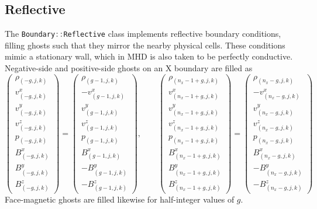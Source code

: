 \documentclass[11pt]{report}
\newcommand{\cpp}[1]{\lstinline[language=C++]{#1}}
\begin{document}
\subsection{Reflective}
The \cpp{Boundary::Reflective} class implements reflective boundary conditions, filling ghosts such that they mirror the nearby physical cells. These conditions mimic a stationary wall, which in MHD is also taken to be perfectly conductive. Negative-side and positive-side ghosts  on an X boundary are filled as 
\begin{equation}
\begin{pmatrix}
\rho_{(-g,j,k)}\\
v^x_{(-g,j,k)}\\
v^y_{(-g,j,k)}\\
v^z_{(-g,j,k)}\\
p_{(-g,j,k)}\\
B^x_{(-g,j,k)}\\
B^y_{(-g,j,k)}\\
B^z_{(-g,j,k)}
\end{pmatrix} = \begin{pmatrix}
\rho_{(g-1,j,k)}\\
-v^x_{(g-1,j,k)}\\
v^y_{(g-1,j,k)}\\
v^z_{(g-1,j,k)}\\
p_{(g-1,j,k)}\\
B^x_{(g-1,j,k)}\\
-B^y_{(g-1,j,k)}\\
-B^z_{(g-1,j,k)}
\end{pmatrix}
,\qquad
\begin{pmatrix}
\rho_{(n_x-1+g,j,k)}\\
v^x_{(n_x-1+g,j,k)}\\
v^y_{(n_x-1+g,j,k)}\\
v^z_{(n_x-1+g,j,k)}\\
p_{(n_x-1+g,j,k)}\\
B^x_{(n_x-1+g,j,k)}\\
B^y_{(n_x-1+g,j,k)}\\
B^z_{(n_x-1+g,j,k)}
\end{pmatrix} = \begin{pmatrix}
\rho_{(n_x-g,j,k)}\\
-v^x_{(n_x-g,j,k)}\\
v^y_{(n_x-g,j,k)}\\
v^z_{(n_x-g,j,k)}\\
p_{(n_x-g,j,k)}\\
B^x_{(n_x-g,j,k)}\\
-B^y_{(n_x-g,j,k)}\\
-B^z_{(n_x-g,j,k)}
\end{pmatrix}
\end{equation}
Face-magnetic ghosts are filled likewise for half-integer values of $g$.
\end{document}
